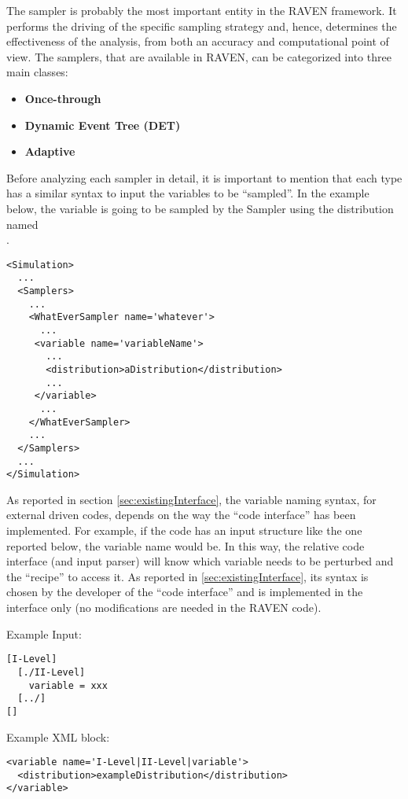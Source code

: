 The sampler is probably the most important entity in the RAVEN framework.
%
It performs the driving of the specific sampling strategy and, hence, determines
the effectiveness of the analysis, from both an accuracy and computational point
of view.
%
The samplers, that are available in RAVEN, can be categorized into three main
classes:
\begin{itemize}
\item \textbf{Once-through}
\item \textbf{Dynamic Event Tree (DET)}
\item \textbf{Adaptive}
\end{itemize}
Before analyzing each sampler in detail, it is important to mention that each
type has a similar syntax to input the variables to be ``sampled''.
%
In the example below, the variable  is going to be
sampled by the Sampler  using the distribution named\\
.
\begin{lstlisting}[style=XML]
<Simulation>
  ...
  <Samplers>
    ...
    <WhatEverSampler name='whatever'>
      ...
     <variable name='variableName'>
       ...
       <distribution>aDistribution</distribution>
       ...
     </variable>
      ...
    </WhatEverSampler>
    ...
  </Samplers>
  ...
</Simulation>
\end{lstlisting}

As reported in section \ref{sec:existingInterface}, the variable naming syntax,
for external driven codes, depends on the way the ``code interface'' has been
implemented.
%
For example, if the code has an input structure like the one reported below, the
variable name would be.
%
In this way, the relative code interface (and input parser) will know which
variable needs to be perturbed and the ``recipe'' to access it.
%
As reported in \ref{sec:existingInterface}, its syntax is chosen by the
developer of the ``code interface'' and is implemented in the interface only
(no modifications are needed in the RAVEN code).


Example Input:
\begin{lstlisting}
[I-Level]
  [./II-Level]
    variable = xxx
  [../]
[]
\end{lstlisting}

Example XML block:
\begin{lstlisting}[style=XML]
<variable name='I-Level|II-Level|variable'>
  <distribution>exampleDistribution</distribution>
</variable>
\end{lstlisting}

